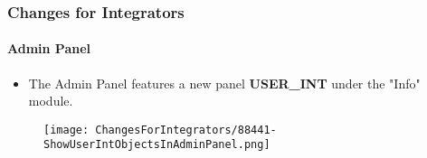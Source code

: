 
\begin{frame}[fragile]
	\frametitle{Changes for Integrators}
	\framesubtitle{Admin Panel}

	\begin{itemize}
		\item The Admin Panel features a new panel \textbf{USER\_INT} under the "Info" module.
	\end{itemize}

	\begin{figure}
		\texttt{[image: ChangesForIntegrators/88441-ShowUserIntObjectsInAdminPanel.png]}
	\end{figure}

\end{frame}

